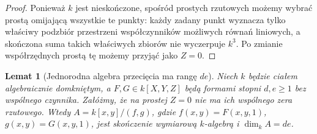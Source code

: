 \documentclass[11pt,a4paper,openany]{report}
\numberwithin{equation}{section}
\theoremstyle{plain}
\newtheorem{lemat}[twierdzenie]{Lemat}
\theoremstyle{definition}
\theoremstyle{remark}
\begin{document}
\begin{proof}
Ponieważ $k$ jest nieskończone, spośród prostych rzutowych
możemy wybrać prostą omijającą wszystkie te punkty:
każdy zadany punkt wyznacza tylko właściwy podzbiór
przestrzeni współczynników możliwych równań liniowych,
a skończona suma takich właściwych zbiorów nie wyczerpuje
$k^3$. Po zmianie współrzędnych prostą tę możemy przyjąć
jako $Z=0$.
\end{proof}

\begin{lemat}[Jednorodna algebra przecięcia ma rangę $de$]
\label{lem:bezout-rank}
Niech $k$ będzie ciałem algebraicznie domkniętym,
a $F,G\in k[X,Y,Z]$ będą formami stopni $d,e\ge1$
bez wspólnego czynnika. Załóżmy, że na prostej $Z=0$
nie ma ich wspólnego zera rzutowego.
Wtedy $A=k[x,y]/(f,g)$, gdzie
$f(x,y)=F(x,y,1)$, $g(x,y)=G(x,y,1)$,
jest skończenie wymiarową $k$-algebrą i
$\dim_kA=de$.
\end{lemat}
\end{document}
